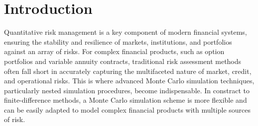 \chapter{Introduction}

Quantitative risk management is a key component of modern financial systems, ensuring the stability and resilience of markets, institutions, and portfolios against an array of risks. 
For complex financial products, such as option portfolios and variable annuity contracts, traditional risk assessment methods often fall short in accurately capturing the multifaceted nature of market, credit, and operational risks. 
This is where advanced Monte Carlo simulation techniques, particularly nested simulation procedures, become indispensable.
In constract to finite-difference methods, a Monte Carlo simulation scheme is more flexible and can be easily adapted to model complex financial products with multiple sources of risk.
